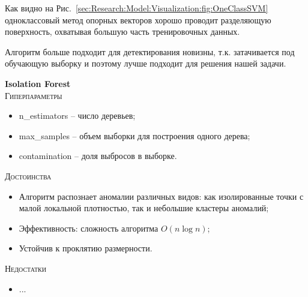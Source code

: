 \documentclass[12pt]{article}
\begin{document}
    \par Как видно на Рис.~\ref{sec:Research:Model:Visualization:fig:OneClassSVM} одноклассовый метод опорных векторов хорошо проводит разделяющую поверхность, охватывая большую часть тренировочных данных.

    \par Алгоритм больше подходит для детектирования новизны, т.к. затачивается под обучающую выборку и поэтому лучше подходит для решения нашей задачи.
    
    \newpage


    \textbf{Isolation Forest} \\

    \noindent \textsc{Гиперпараметры}
    \begin{itemize}
        \item n\_estimators – число деревьев;
        \item max\_samples – объем выборки для построения одного дерева;
        \item contamination – доля выбросов в выборке.
    \end{itemize}

    \noindent \textsc{Достоинства}
    \begin{itemize}
        \item Алгоритм распознает аномалии различных видов: как изолированные точки с малой локальной плотностью, так и небольшие кластеры аномалий;
        \item Эффективность: сложность алгоритма $ O(n \log n) $;
        \item Устойчив к проклятию размерности.
    \end{itemize}

    \noindent \textsc{Недостатки}
    \begin{itemize}
        \item ...
    \end{itemize}
\end{document}
